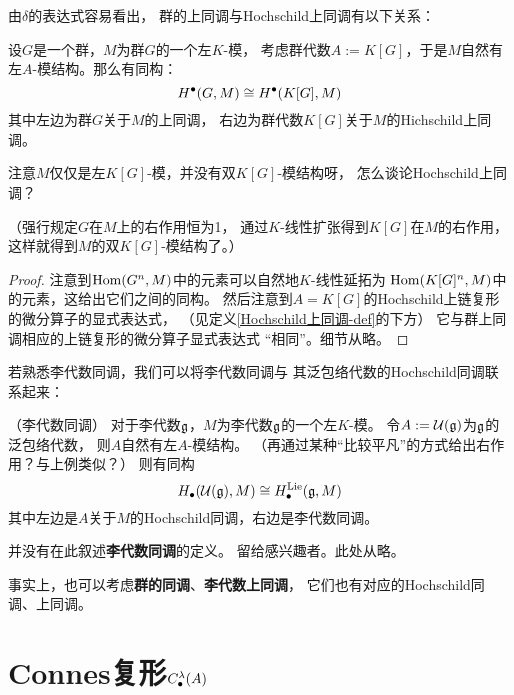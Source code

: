 由$\delta$的表达式容易看出，
群的上同调与Hochschild上同调有以下关系：

\begin{prop}设$G$是一个群，$M$为群$G$的一个左$K$-模，
考虑群代数$A:=K[G]$，于是$M$自然有左$A$-模结构。那么有同构：
$$H^{\bullet}(G,M)\cong H^{\bullet}(K[G],M)$$
其中左边为群$G$关于$M$的上同调，
右边为群代数$K[G]$关于$M$的Hichschild上同调。
\end{prop}

{\color{red}
注意$M$仅仅是左$K[G]$-模，并没有双$K[G]$-模结构呀，
怎么谈论Hochschild上同调？

\color{purple}
（强行规定$G$在$M$上的右作用恒为1，
通过$K$-线性扩张得到$K[G]$在$M$的右作用，
这样就得到$M$的双$K[G]$-模结构了。）}

\begin{proof}
注意到$\operatorname{Hom}(G^n,M)$中的元素可以自然地$K$-线性延拓为
$\operatorname{Hom}(K[G]^n,M)$中的元素，这给出它们之间的同构。
然后注意到$A=K[G]$的Hochschild上链复形的微分算子的显式表达式，
（见定义\ref{Hochschild上同调-def}的下方）
它与群上同调相应的上链复形的微分算子显式表达式
“相同”。细节从略。
\end{proof}

若熟悉李代数同调，我们可以将李代数同调与
其泛包络代数的Hochschild同调联系起来：

\begin{example}（李代数同调）%
对于李代数$\mathfrak{g}$，$M$为李代数$\mathfrak{g}$的一个左$K$-模。
令$A:=\mathcal{U}(\mathfrak{g})$为$\mathfrak{g}$的泛包络代数，
则$A$自然有左$A$-模结构。
（再通过某种“比较平凡”的方式给出右作用？与上例类似？）
则有同构
$$H_{\bullet}(\mathcal{U}(\mathfrak{g}),M)
\cong H^{\operatorname{Lie}}_{\bullet}(\mathfrak{g},M)$$
其中左边是$A$关于$M$的Hochschild同调，右边是李代数同调。
\end{example}

并没有在此叙述\textbf{李代数同调}的定义。
留给感兴趣者。此处从略。

事实上，也可以考虑\textbf{群的同调}、\textbf{李代数上同调}，
它们也有对应的Hochschild同调、上同调。



\section{Connes复形$C^{\lambda}_{\bullet}(A)$}

